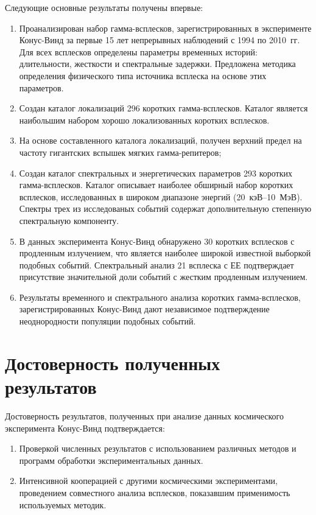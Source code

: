 Следующие основные результаты получены впервые:
\begin{enumerate}
\item Проанализирован набор гамма-всплесков, зарегистрированных в эксперименте 
 Конус-Винд за первые 15 лет непрерывных наблюдений с 1994 по 2010~гг. Для всех 
 всплесков определены параметры временных историй: длительности, жесткости и спектральные задержки.
 Предложена методика определения физического типа источника всплеска на основе этих параметров.
\item Создан каталог локализаций 296 коротких гамма-всплесков. Каталог является 
 наибольшим набором хорошо локализованных коротких всплесков. 
\item На основе составленного каталога локализаций,
 получен верхний предел на частоту гигантских вспышек мягких гамма-репитеров;
\item Создан каталог спектральных и энергетических параметров 293 коротких гамма-всплесков. 
 Каталог описывает наиболее обширный набор коротких всплесков, исследованных 
 в широком диапазоне энергий (20~кэВ--10~МэВ). Спектры трех из исследованых событий 
 содержат дополнительную степенную спектральную компоненту.
\item В данных эксперимента Конус-Винд обнаружено 30 коротких всплесков с продленным излучением, 
что является наиболее широкой известной выборкой подобных событий.
Спектральный анализ 21 всплеска с ЕЕ подтверждает присутствие значительной доли 
событий с жестким продленным излучением.   
\item Результаты временного и спектрального анализа коротких гамма-всплесков, 
 зарегистрированных Конус-Винд дают независимое подтверждение неоднородности популяции подобных событий.
\end{enumerate}

\section{Достоверность полученных результатов}
Достоверность результатов, полученных при анализе данных космического
эксперимента Конус-Винд подтверждается:
\begin{enumerate}
\item Проверкой численных результатов с использованием различных методов и 
программ обработки экспериментальных данных.
\item Интенсивной кооперацией с другими космическими экспериментами,
проведением совместного анализа всплесков, показавшим применимость используемых методик.
\end{enumerate}

